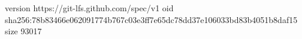 version https://git-lfs.github.com/spec/v1
oid sha256:78b83466e062091774b767c03e3ff7e65dc78dd37e106033bd83b4051b8daf15
size 93017
